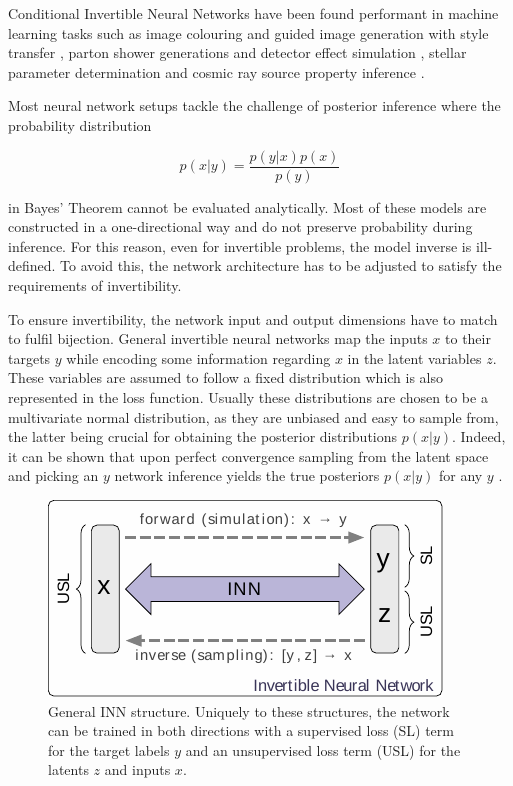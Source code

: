 
Conditional Invertible Neural Networks have been found performant in machine learning tasks such as image colouring and guided image generation with style transfer \cite{cINN_im_gen}, parton shower generations and detector effect simulation \cite{Bellagente_2020}, stellar parameter determination \cite{Ksoll_2020} and cosmic ray source property inference \cite{Bister_2022}.

Most neural network setups tackle the challenge of posterior inference where the probability distribution 

\begin{equation*}
	p(x | y) = \frac{p(y | x) p(x)}{p(y)}
\end{equation*}

in Bayes' Theorem cannot be evaluated analytically. Most of these models are constructed in a one-directional way and do not preserve probability during inference. For this reason, even for invertible problems, the model inverse is ill-defined. To avoid this, the network architecture has to be adjusted to satisfy the requirements of invertibility.


To ensure invertibility, the network input and output dimensions have to match to fulfil bijection. General invertible neural networks map the inputs $x$ to their targets $y$ while encoding some information regarding $x$ in the latent variables $z$. These variables are assumed to follow a fixed distribution which is also represented in the loss function. Usually these distributions are chosen to be a multivariate normal distribution, as they are unbiased and easy to sample from, the latter being crucial for obtaining the posterior distributions $p(x | y)$. Indeed, it can be shown that upon perfect convergence sampling from the latent space and picking an $y$ network inference yields the true posteriors $p(x | y)$ for any $y$ \cite{INN_Ardizzone}.

\begin{figure}[h!]
	\centering
	\includegraphics[width=0.6\linewidth]{figures/neural_networks/inns.pdf}
	\caption{General INN structure. Uniquely to these structures\protect\footnotemark, the network can be trained in both directions with a supervised loss (SL) term for the target labels $y$ and an unsupervised loss term (USL) for the latents $z$ and inputs $x$. \cite{INN_Ardizzone}}
	\label{fig:inn}
\end{figure}

